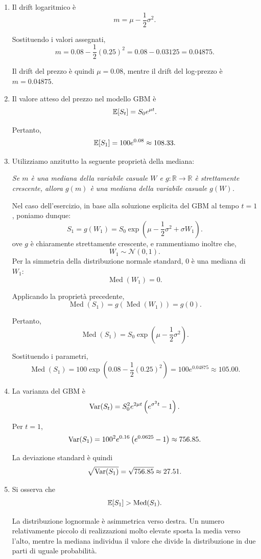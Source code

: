 \begin{enumerate}

\item Il drift logaritmico \`{e}
\[
m
=
\mu-\frac{1}{2}\sigma^2.
\]

Sostituendo i valori assegnati,
\[
m
=
0.08-\frac{1}{2}(0.25)^2
=
0.08-0.03125
=
0.04875.
\]

Il drift del prezzo \`{e} quindi $\mu=0.08$, mentre il drift del
log-prezzo \`{e} $m=0.04875$.

\item Il valore atteso del prezzo nel modello GBM \`{e}
\[
\mathbb{E}[S_t]
=
S_0e^{\mu t}.
\]

Pertanto,
\[
\mathbb{E}[S_1]
=
100e^{0.08}
\approx
108.33.
\]

\item Utilizziamo anzitutto la seguente propriet\`{a} della mediana:

\medskip

\noindent
\textit{Se $m$ \`{e} una mediana della variabile casuale $W$ e
$g:\mathbb{R}\rightarrow\mathbb{R}$ \`{e} strettamente crescente,
allora $g(m)$ \`{e} una mediana della variabile casuale $g(W)$.}


Nel caso dell'esercizio, in base alla soluzione esplicita del GBM al tempo
$t=1$, poniamo dunque:
\[
S_1
= g(W_1)=
S_0
\exp\left(
\mu-\frac{1}{2}\sigma^2+\sigma W_1
\right).
\]
ove $g$ \`{e} chiaramente strettamente crescente, e rammentiamo inoltre che,
\[
W_1\sim\mathcal{N}(0,1).
\]
Per la simmetria della distribuzione normale standard, $0$ \`{e} una
mediana di $W_1$:
\[
\operatorname{Med}(W_1)=0.
\]

Applicando la propriet\`{a} precedente,
\[
\operatorname{Med}(S_1)
=
g\left(\operatorname{Med}(W_1)\right)
=
g(0).
\]

Pertanto,
\[
\operatorname{Med}(S_1)
=
S_0
\exp\left(
\mu-\frac{1}{2}\sigma^2
\right).
\]

Sostituendo i parametri,
\[
\operatorname{Med}(S_1)
=
100
\exp\left(
0.08-\frac{1}{2}(0.25)^2
\right)
=
100e^{0.04875}
\approx
105.00.
\]

\item La varianza del GBM \`{e}
\[
\operatorname{Var}(S_t)
=
S_0^2e^{2\mu t}
\left(
e^{\sigma^2t}-1
\right).
\]

Per $t=1$,
\[
\operatorname{Var}(S_1)
=
100^2e^{0.16}
\left(
e^{0.0625}-1
\right)
\approx
756.85.
\]

La deviazione standard \`{e} quindi
\[
\sqrt{\operatorname{Var}(S_1)}
=
\sqrt{756.85}
\approx
27.51.
\]

\item Si osserva che
\[
\mathbb{E}[S_1]
>
\operatorname{Med}(S_1).
\]

La distribuzione lognormale \`{e} asimmetrica verso destra. Un numero
relativamente piccolo di realizzazioni molto elevate sposta la media
verso l'alto, mentre la mediana individua il valore che divide la
distribuzione in due parti di uguale probabilit\`{a}.

\end{enumerate}

